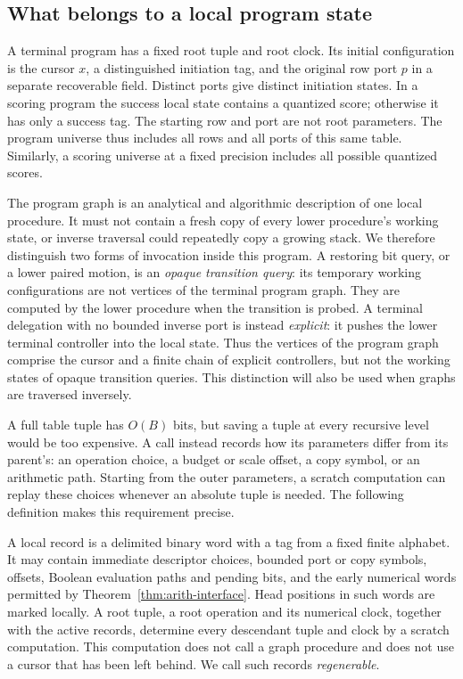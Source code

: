 \subsection{What belongs to a local program state}\label{sec:ctrl-graphs}

A terminal program has a fixed root tuple and root clock.  Its initial
configuration is the cursor $x$, a distinguished initiation tag, and the
original row port $p$ in a separate recoverable field.  Distinct ports
give distinct initiation states.  In a scoring program the success local state contains a
quantized score; otherwise it has only a success tag.  The starting row
and port are not root parameters.  The program universe thus includes
all rows and all ports of this same table.  Similarly, a scoring
universe at a fixed precision includes all possible quantized scores.

The program graph is an analytical and algorithmic description of one local procedure. It must not contain a fresh copy of every lower procedure's working state, or inverse traversal could repeatedly copy a growing stack. We therefore distinguish two forms of invocation inside this program.  A
restoring bit query, or a lower paired motion, is an \emph{opaque
transition query}: its temporary working configurations are not vertices
of the terminal program graph.  They are computed by the lower
procedure when the transition is probed.  A terminal delegation with no
bounded inverse port is instead \emph{explicit}: it pushes the lower
terminal controller into the local state.  Thus the vertices of the
program graph comprise the cursor and a finite chain of explicit
controllers, but not the working states of opaque transition queries.
This distinction will also be used when graphs are traversed inversely.

A full table tuple has $O(B)$ bits, but saving a tuple at every recursive level would be too expensive. A call instead records how its parameters differ from its parent's: an operation choice, a budget or scale offset, a copy symbol, or an arithmetic path. Starting from the outer parameters, a scratch computation can replay these choices whenever an absolute tuple is needed. The following definition makes this requirement precise.

\begin{definition}\label{def:ctrl-record}
A local record is a delimited binary word with a tag from a fixed finite
alphabet.  It may contain immediate descriptor choices, bounded port or
copy symbols, offsets, Boolean evaluation paths and pending bits, and the
early numerical words permitted by Theorem~\ref{thm:arith-interface}.
Head positions in such words are marked locally.  A root tuple, a root
operation and its numerical clock, together with the active records,
determine every descendant tuple and clock by a scratch computation.
This computation does not call a graph procedure and does not use a
cursor that has been left behind.  We call such records
\emph{regenerable}.
\end{definition}

